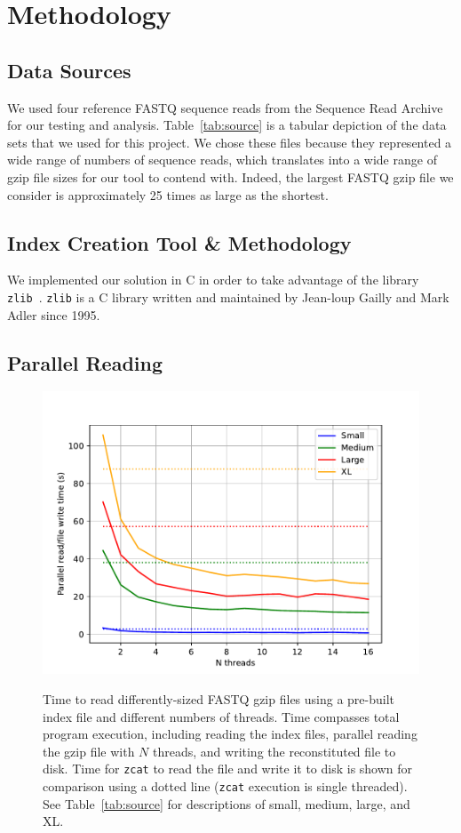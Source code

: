 \documentclass[unnumsec,webpdf,contemporary,large]{oup-authoring-template}
\newcommand{\zlib}{\texttt{zlib}\xspace}
\newcommand{\gzip}{gzip\xspace}
\begin{document}
\section{Methodology}

\subsection{Data Sources}

We used four reference FASTQ sequence reads from the Sequence Read
Archive~\cite{SRA} for our testing and analysis. Table~\ref{tab:source} is a
tabular depiction of the data sets that we used for this project. We chose these
files because they represented a wide range of numbers of sequence reads, which
translates into a wide range of \gzip file sizes for our tool to contend with.
Indeed, the largest FASTQ \gzip file we consider is approximately 25 times as
large as the shortest.

\subsection{Index Creation Tool \& Methodology}

We implemented our solution in C in order to take advantage of the library
\zlib~\cite{zlib}. \zlib is a C library written and maintained by Jean-loup
Gailly and Mark Adler since 1995. 

\subsection{Parallel Reading}


\begin{figure}
    \includegraphics[width=\linewidth]{figs/cores.pdf}
    \label{fig:cores}
    \caption{Time to read differently-sized FASTQ \gzip files using a pre-built
    index file and different numbers of threads. Time compasses total program
    execution, including reading the index files, parallel reading the \gzip
    file with $N$ threads, and writing the reconstituted file to disk. Time for
    \texttt{zcat} to read the file and write it to disk is shown for comparison
    using a dotted line (\texttt{zcat} execution is single threaded). See
    Table~\ref{tab:source} for descriptions of small, medium, large, and XL.}
\end{figure}
\end{document}
